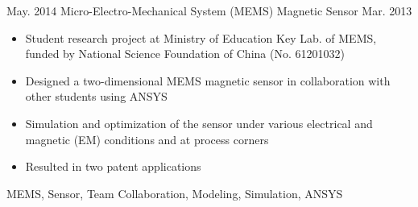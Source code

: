 \begin{projects}
  \project
    {May. 2014}   {Micro-Electro-Mechanical System (MEMS) Magnetic Sensor}
    {Mar. 2013} {
                      \begin{itemize}
                        \item Student research project at Ministry of Education Key Lab. of MEMS, funded by National Science Foundation of China (No. 61201032)
                        \item Designed a two-dimensional MEMS magnetic sensor in collaboration with other students using ANSYS
                        \item Simulation and optimization of the sensor under various electrical and magnetic (EM) conditions and at process corners
                        \item Resulted in two patent applications
                      \end{itemize}
                    }
                    {MEMS, Sensor, Team Collaboration, Modeling, Simulation, ANSYS}

\end{projects}
